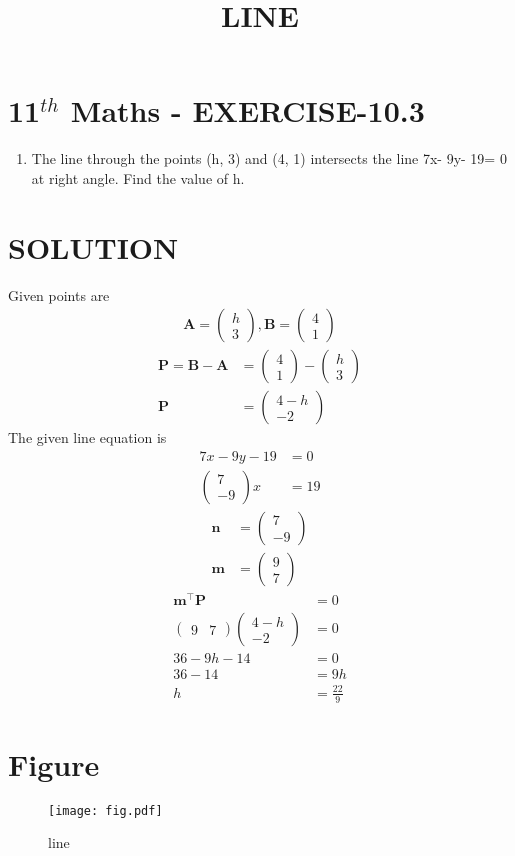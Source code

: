 \documentclass[12pt]{article}
\newcommand{\myvec}[1]{\ensuremath{\begin{pmatrix}#1\end{pmatrix}}}
\let\vec\mathbf
\begin{document}
\begin{center}
\title{\textbf{LINE}}
\date{\vspace{-5ex}} %
\maketitle
\end{center}

\section{11$^{th}$ Maths - EXERCISE-10.3}
\begin{enumerate}
\item The line through the points (h, 3) and (4, 1) intersects the line 7x- 9y- 19= 0 at right angle. Find the value of h.
\end{enumerate}
\section{SOLUTION}
Given points are 
\begin{align}
\vec{A}=\myvec{h\\ 3},\vec{B}=\myvec{4\\ 1}
\end{align}
\begin{align}
\vec{P}=\vec{B}-\vec{A}&=\myvec{4\\ 1}-\myvec{h\\ 3}\\
\vec{P}&=\myvec{4-h\\ -2}
\end{align}
The given line equation is 
\begin{align}
7x-9y-19&=0\\
\myvec{7\\ -9}x&=19
\end{align}
\begin{align}
\vec{n}&=\myvec{7\\ -9}\\
\vec{m}&=\myvec{9\\ 7}
\end{align}
\begin{align}
\vec{m}^\top\vec{P}&=0\\
\myvec{9& 7}\myvec{4-h\\ -2}&=0\\
36-9h-14&=0\\
36-14&=9h\\
h&=\frac{22}{9}
\end{align}
\section{Figure}
\begin{figure}[h]
\centering
\texttt{[image: fig.pdf]}
\caption{line}
		\label{fig:Figure}
\end{figure}
\end{document}
